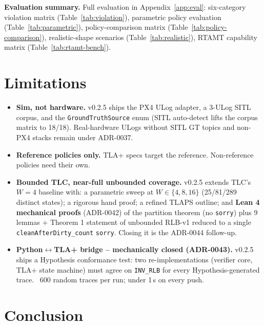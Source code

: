 \documentclass[11pt,a4paper]{article}
\begin{document}
\textbf{Evaluation summary.} Full evaluation in
Appendix~\ref{app:eval}: six-category violation matrix
(Table~\ref{tab:violation}), parametric policy evaluation
(Table~\ref{tab:parametric}), policy-comparison matrix
(Table~\ref{tab:policy-comparison}), realistic-shape scenarios
(Table~\ref{tab:realistic}), RTAMT capability matrix
(Table~\ref{tab:rtamt-bench}).

\section{Limitations}
\label{sec:limits}

\begin{itemize}[noitemsep,topsep=2pt]
  \item \textbf{Sim, not hardware.} v0.2.5 ships the PX4 ULog
        adapter, a 3-ULog SITL corpus, and the
        \texttt{GroundTruthSource} enum (SITL auto-detect lifts
        the corpus matrix to 18/18). Real-hardware ULogs without
        SITL GT topics and non-PX4 stacks remain under ADR-0037.
  \item \textbf{Reference policies only.} TLA+ specs target the
        reference. Non-reference policies need their own.
  \item \textbf{Bounded TLC, near-full unbounded coverage.}
        v0.2.5 extends TLC's $W = 4$ baseline with: a
        parametric sweep at $W \in \{4, 8, 16\}$ (25/81/289
        distinct states); a rigorous hand proof; a refined
        TLAPS outline; and \textbf{Lean 4 mechanical proofs}
        (ADR-0042) of the partition theorem (no \texttt{sorry})
        plus 9 lemmas + Theorem 1 statement of unbounded RLB-v1
        reduced to a single \texttt{cleanAfterDirty\_count}
        \texttt{sorry}. Closing it is the ADR-0044 follow-up.
  \item \textbf{Python$\leftrightarrow$TLA+ bridge --
        mechanically closed (ADR-0043).} v0.2.5 ships a
        Hypothesis conformance test: two re-implementations
        (verifier core, TLA+ state machine) must agree on
        \texttt{INV\_RLB} for every Hypothesis-generated trace.
        ~600 random traces per run; under 1\,s on every push.
\end{itemize}

\section{Conclusion}
\label{sec:conclusion}
\end{document}
